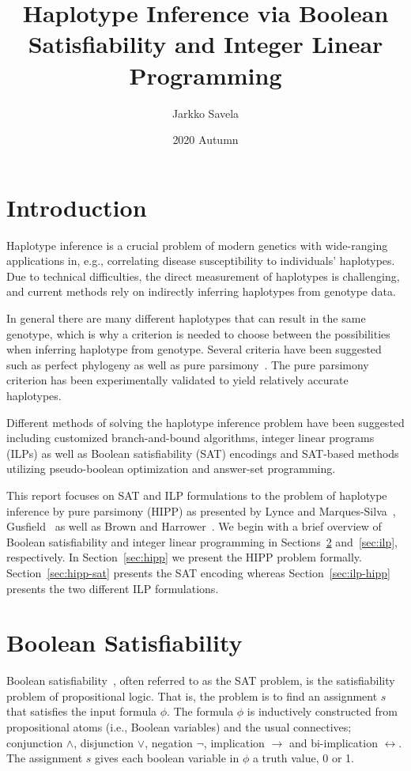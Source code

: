 \documentclass[12pt,a4paper]{article}
\title{Haplotype Inference via Boolean Satisfiability and Integer Linear Programming}
\date{2020 Autumn}
\author{Jarkko Savela}
\begin{document}
\maketitle
\newpage
\tableofcontents
\newpage
{}

\section{Introduction}
Haplotype inference is a crucial problem of modern genetics with wide-ranging applications in, e.g., correlating disease susceptibility to individuals' haplotypes.
Due to technical difficulties, the direct measurement of haplotypes is challenging, and current methods rely on indirectly inferring haplotypes from genotype data.

In general there are many different haplotypes that can result in the same genotype, 
which is why a criterion is needed to choose between the possibilities when inferring haplotype from genotype.
Several criteria have been suggested such as perfect phylogeny as well as pure parsimony~\cite{gusfield2019integer}.
The pure parsimony criterion has been experimentally validated to yield relatively accurate haplotypes.

Different methods of solving the haplotype inference problem have been suggested including customized branch-and-bound algorithms, integer linear programs (ILPs) as well as Boolean satisfiability (SAT) encodings and SAT-based methods utilizing pseudo-boolean optimization and answer-set programming.

This report focuses on SAT and ILP formulations to the problem of haplotype inference by pure parsimony (HIPP) as presented by Lynce and Marques-Silva~\cite{DBLP:conf/aaai/LynceM06}, Gusfield~\cite{DBLP:conf/cpm/Gusfield03} as well as Brown and Harrower~\cite{DBLP:journals/tcbb/BrownH06}.
We begin with a brief overview of Boolean satisfiability and integer linear programming in Sections~\ref{sec:sat} and~\ref{sec:ilp}, respectively.
In Section~\ref{sec:hipp} we present the HIPP problem formally.
Section~\ref{sec:hipp-sat} presents the SAT encoding whereas 
Section~\ref{sec:ilp-hipp} presents the two different ILP formulations. 



\section{Boolean Satisfiability}
\label{sec:sat}
Boolean satisfiability~\cite{DBLP:series/faia/2009-185}, often referred to as the SAT problem, is the satisfiability problem of propositional logic.
That is, the problem is to find an assignment $s$ that satisfies the input formula $\phi$.
The formula $\phi$ is inductively constructed from propositional atoms (i.e., Boolean variables) and the usual connectives; conjunction $\wedge$, disjunction $\vee$, negation $\neg$, implication $\rightarrow$ and bi-implication $\leftrightarrow$.
The assignment $s$ gives each boolean variable in $\phi$ a truth value, 0 or 1.
\end{document}
